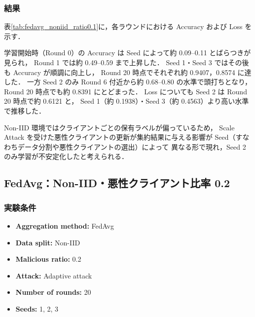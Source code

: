 \documentclass[a4j,twocolumn,dvipdfmx]{jsarticle}
\begin{document}
\subsubsection{結果}

表\ref{tab:fedavg_noniid_ratio0.1}に，各ラウンドにおける
Accuracy および Loss を示す．

学習開始時（Round 0）の Accuracy は Seed によって約 0.09--0.11 とばらつきが見られ，
Round 1 では約 0.49--0.59 まで上昇した．
Seed 1・Seed 3 ではその後も Accuracy が順調に向上し，
Round 20 時点でそれぞれ約 0.9407，0.8574 に達した．
一方 Seed 2 のみ Round 6 付近から約 0.68--0.80 の水準で頭打ちとなり，
Round 20 時点でも約 0.8391 にとどまった．
Loss についても Seed 2 は Round 20 時点で約 0.6121 と，
Seed 1（約 0.1938）・Seed 3（約 0.4563）より高い水準で推移した．

Non-IID 環境ではクライアントごとの保有ラベルが偏っているため，
Scale Attack を受けた悪性クライアントの更新が集約結果に与える影響が
Seed（すなわちデータ分割や悪性クライアントの選出）によって
異なる形で現れ，Seed 2 のみ学習が不安定化したと考えられる．

\clearpage
\subsection{FedAvg：Non-IID・悪性クライアント比率 0.2}

\subsubsection{実験条件}

\begin{itemize}
    \item \textbf{Aggregation method:} FedAvg
    \item \textbf{Data split:} Non-IID
    \item \textbf{Malicious ratio:} 0.2
    \item \textbf{Attack:} Adaptive attack
    \item \textbf{Number of rounds:} 20
    \item \textbf{Seeds:} 1, 2, 3
\end{itemize}

\end{document}
